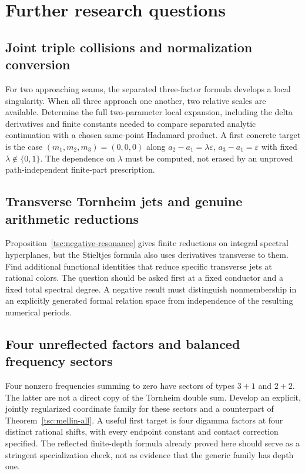 \documentclass[11pt]{article}
\numberwithin{equation}{section}
\theoremstyle{definition}\newtheorem{definition}[theorem]{Definition}
\theoremstyle{remark}\newtheorem{remark}[theorem]{Remark}
\begin{document}

\section{Further research questions}\label{tsc:further}
\subsection{Joint triple collisions and normalization conversion}
For two approaching seams, the separated three-factor formula develops a
local singularity. When all three approach one another, two relative
scales are available. Determine the full two-parameter local expansion,
including the delta derivatives and finite constants needed to compare
separated analytic continuation with a chosen same-point Hadamard product.
A first concrete target is the case $(m_1,m_2,m_3)=(0,0,0)$ along
$a_2-a_1=\lambda\varepsilon$, $a_3-a_1=\varepsilon$ with fixed
$\lambda\notin\{0,1\}$. The dependence on $\lambda$ must be computed,
not erased by an unproved path-independent finite-part prescription.

\subsection{Transverse Tornheim jets and genuine arithmetic reductions}
Proposition~\ref{tsc:negative-resonance} gives finite reductions on integral
spectral hyperplanes, but the Stieltjes formula also uses derivatives
transverse to them. Find additional functional identities that reduce
specific transverse jets at rational colors. The question should be asked
first at a fixed conductor and a fixed total spectral degree. A negative
result must distinguish nonmembership in an explicitly generated formal
relation space from independence of the resulting numerical periods.

\subsection{Four unreflected factors and balanced frequency sectors}
Four nonzero frequencies summing to zero have sectors of types $3+1$ and
$2+2$. The latter are not a direct copy of the Tornheim double sum. Develop
an explicit, jointly regularized coordinate family for these sectors and
a counterpart of Theorem~\ref{tsc:mellin-all}. A useful first target is
four digamma factors at four distinct rational shifts, with every endpoint
constant and contact correction specified. The reflected finite-depth
formula already proved here should serve as a stringent specialization
check, not as evidence that the generic family has depth one.
\end{document}
